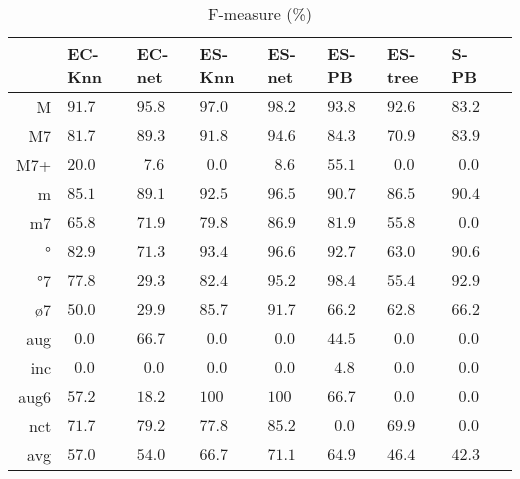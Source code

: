 \begin{table}
  \centering
\begin{tabular}{r|p{0.5cm}p{0.5cm}p{0.5cm}p{0.5cm}p{0.5cm}p{0.5cm}p{0.5cm}p{0.5cm}}
     &   EC-Knn &   EC-net &   ES-Knn &   ES-net &    ES-PB &  ES-tree &        S-PB \\ \hline
   M & $  91.7$ & $  95.8$ & $  97.0$ & $  98.2$ & $  93.8$ & $  92.6$ & $  83.2$ \\
  M7 & $  81.7$ & $  89.3$ & $  91.8$ & $  94.6$ & $  84.3$ & $  70.9$ & $  83.9$ \\
 M7+ & $  20.0$ & $ ~~7.6$ & $ ~~0.0$ & $ ~~8.6$ & $  55.1$ & $ ~~0.0$ & $ ~~0.0$ \\
   m & $  85.1$ & $  89.1$ & $  92.5$ & $  96.5$ & $  90.7$ & $  86.5$ & $  90.4$ \\
  m7 & $  65.8$ & $  71.9$ & $  79.8$ & $  86.9$ & $  81.9$ & $  55.8$ & $ ~~0.0$ \\
   ° & $  82.9$ & $  71.3$ & $  93.4$ & $  96.6$ & $  92.7$ & $  63.0$ & $  90.6$ \\
  °7 & $  77.8$ & $  29.3$ & $  82.4$ & $  95.2$ & $  98.4$ & $  55.4$ & $  92.9$ \\
  ø7 & $  50.0$ & $  29.9$ & $  85.7$ & $  91.7$ & $  66.2$ & $  62.8$ & $  66.2$ \\
 aug & $ ~~0.0$ & $  66.7$ & $ ~~0.0$ & $ ~~0.0$ & $  44.5$ & $ ~~0.0$ & $ ~~0.0$ \\
 inc & $ ~~0.0$ & $ ~~0.0$ & $ ~~0.0$ & $ ~~0.0$ & $ ~~4.8$ & $ ~~0.0$ & $ ~~0.0$ \\
aug6 & $  57.2$ & $  18.2$ & $ 100  $ & $ 100  $ & $  66.7$ & $ ~~0.0$ & $ ~~0.0$ \\
 nct & $  71.7$ & $  79.2$ & $  77.8$ & $  85.2$ & $ ~~0.0$ & $  69.9$ & $ ~~0.0$ \\
\hline                                                       
 avg & $  57.0$ & $  54.0$ & $  66.7$ & $  71.1$ & $  64.9$ & $  46.4$ & $  42.3$ \\
\end{tabular}


  \caption{F-measure (\%)}
  \label{tab:f-measure}
\end{table}



